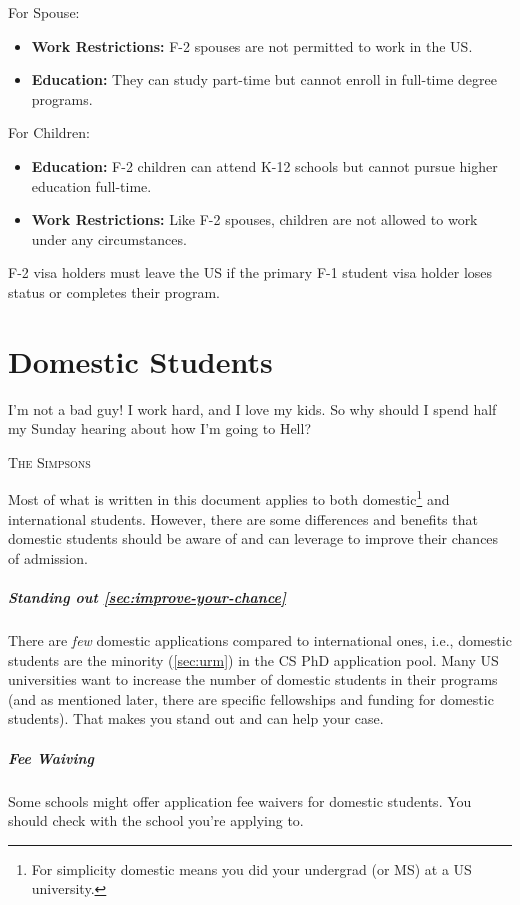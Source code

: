 \documentclass[oneside,11pt,dvipsnames]{book}
\begin{document}
For Spouse: 
\begin{itemize}
\item \textbf{Work Restrictions:} F-2 spouses are not permitted to work in the US.
\item \textbf{Education:} They can study part-time but cannot enroll in full-time degree programs.
\end{itemize}
For Children:
\begin{itemize}
\item \textbf{Education:} F-2 children can attend K-12 schools but cannot pursue higher education full-time.
\item \textbf{Work Restrictions:} Like F-2 spouses, children are not allowed to work under any circumstances.
\end{itemize}
F-2 visa holders must leave the US if the primary F-1 student visa holder loses status or completes their program.

\chapter{Domestic Students}\label{sec:domestic-students}

\epigraph{\vspace{-0.2in} I’m not a bad guy! I work hard, and I love my kids. So why should I spend half my Sunday hearing about how I’m going to Hell?}{\textsc{The Simpsons}}

Most of what is written in this document applies to both domestic\footnote{For simplicity domestic means you did your undergrad (or MS) at a US university.} and international students.  However, there are some differences and benefits that domestic students should be aware of and can leverage to improve their chances of admission.

\paragraph{Standing out \autoref{sec:improve-your-chance}} There are \emph{few} domestic applications compared to international ones, i.e., domestic students are the minority (\autoref{sec:urm}) in the CS PhD application pool. Many US universities want to increase the number of domestic students in their programs (and as mentioned later, there are specific fellowships and funding for domestic students).
That makes you stand out and can help your case.

\paragraph{Fee Waiving} Some schools might offer application fee waivers for domestic students.  You should check with the school you're applying to.
\end{document}

